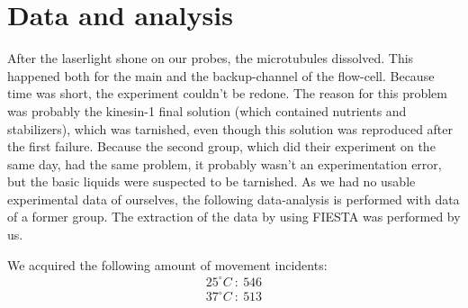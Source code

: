 \documentclass[english, %
parskip=full, %
bibliography=totoc, %
]{scrartcl}
\begin{document}
\section{Data and analysis}

After the laserlight shone on our probes, the microtubules dissolved. This happened both for the main and the backup-channel of the flow-cell. Because time was short, the experiment couldn't be redone.
The reason for this problem was probably the kinesin-1 final solution (which contained nutrients and stabilizers), which was tarnished, even though this solution was reproduced after the first failure. Because the second group, which did their experiment on the same day, had the same problem, it probably wasn't an experimentation error, but the basic liquids were suspected to be tarnished. 
As we had no usable experimental data of ourselves, the following data-analysis is performed with data of a former group. The extraction of the data by using FIESTA was performed by us. 

We acquired the following amount of movement incidents: 
\begin{align*}
25^\circ C \ : \ 546 \\
37^\circ C \ : \ 513
\end{align*}
\end{document}
